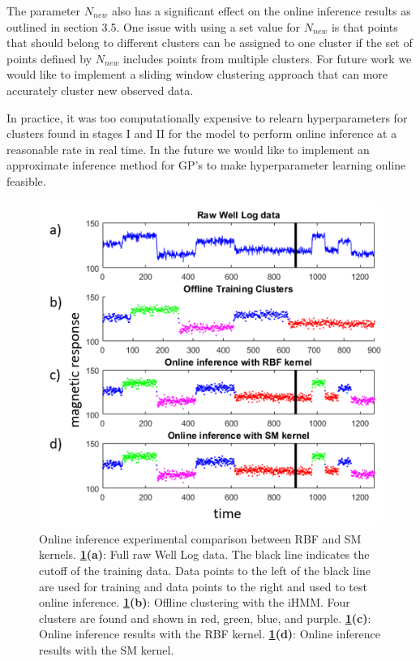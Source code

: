 \documentclass{article}
\begin{document}
The parameter $N_{new}$ also has a significant effect on the online inference results as outlined in section 3.5. One issue with using a set value for $N_{new}$ is that points that should belong to different clusters can be assigned to one cluster if the set of points defined by $N_{new}$ includes points from multiple clusters. For future work we would like to implement a sliding window clustering approach that can more accurately cluster new observed data.

In practice, it was too computationally expensive to relearn hyperparameters for clusters found in stages I and II for the model to perform online inference at a reasonable rate in real time. In the future we would like to implement an approximate inference method \cite{KISS-GP} for GP's to make hyperparameter learning online feasible.

\begin{figure}[ht]
\vskip 0.2in
\begin{center}
\centerline{\includegraphics[width=\columnwidth]{OIClust}}
\caption{Online inference experimental comparison between RBF and SM kernels. \textbf{\ref{OIClust}(a)}: Full raw Well Log data. The black line indicates the cutoff of the training data. Data points to the left of the black line are used for training and data points to the right and used to test online inference. \textbf{\ref{OIClust}(b)}: Offline clustering with the iHMM. Four clusters are found and shown in red, green, blue, and purple. \textbf{\ref{OIClust}(c)}: Online inference results with the RBF kernel. \textbf{\ref{OIClust}(d)}: Online inference results with the SM kernel.}
\label{OIClust}
\end{center}
\vskip -0.2in
\end{figure} 
\end{document}
